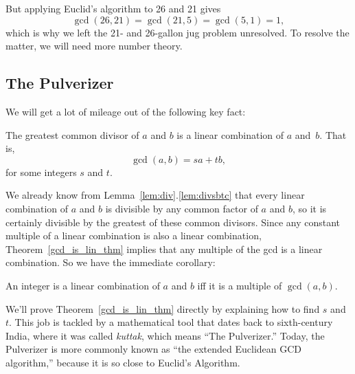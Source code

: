 But applying Euclid's algorithm to 26 and 21 gives
\[
\gcd(26, 21) = \gcd(21, 5) = \gcd(5, 1) = 1,
\]
which is why we left the 21- and 26-gallon jug problem unresolved.  To
resolve the matter, we will need more number theory.

\subsection{The Pulverizer}\label{sec:pulverizer}
We will get a lot of mileage out of the following key fact:
\begin{theorem}\label{gcd_is_lin_thm}
The greatest common divisor of $a$ and $b$ is a linear combination of
$a$ and~$b$.  That is,
\[
\gcd(a, b)  =  s a + t b,
\]
for some integers $s$ and $t$.
\end{theorem}

We already know from Lemma~\ref{lem:div}.\ref{lem:divsbtc} that every
linear combination of $a$ and $b$ is divisible by any common factor of
$a$ and $b$, so it is certainly divisible by the greatest of these
common divisors.  Since any constant multiple of a linear combination
is also a linear combination, Theorem~\ref{gcd_is_lin_thm} implies that
any multiple of the gcd is a linear combination.  So we have the
immediate corollary:
\begin{corollary}\label{cor:lin-comb}
An integer is a linear combination of $a$ and $b$ iff it is a multiple of
$\gcd(a, b)$.
\end{corollary}

We'll prove Theorem~\ref{gcd_is_lin_thm} directly by explaining how to
find $s$ and $t$.  This job is tackled by a mathematical tool that
dates back to sixth-century India, where it was called \emph{kuttak}, 
which
means ``The Pulverizer.''  Today, the Pulverizer is more commonly
known as ``the extended Euclidean GCD algorithm,'' because it is so
close to Euclid's Algorithm.

